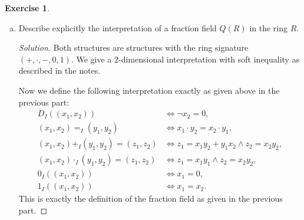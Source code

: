 \documentclass{article}
\renewcommand{\qedsymbol}{\raisebox{-0.5cm}{}}
\newenvironment{solution}{\begin{proof}[Solution]\renewcommand\qedsymbol{}}{\end{proof}}
\theoremstyle{definition}
\newtheorem{question}{Exercise}
\begin{document}
\begin{question}
\begin{enumerate}[(a)]
        \item Describe explicitly the interpretation of a fraction field
              \(Q(R)\) in the ring \(R\).

              \begin{solution}
                  Both structures are structures with the ring signature
                  \((+,\cdot,-,0,1)\). We give a \(2\)-dimensional
                  interpretation with soft inequality as described in the notes.

                  Now we define the following interpretation exactly as given
                  above in the previous part:
                  \begin{align*}
                      D_{I}((x_{1},x_{2}))                              & \Leftrightarrow \neg x_{2}=0,                                       \\
                      (x_{1},x_{2})=_{I}(y_{1},y_{2})                   & \Leftrightarrow x_{1}\cdot y_{2}=x_{2}\cdot y_{1},                  \\
                      (x_{1},x_{2})+_{I}(y_{1},y_{2})=(z_{1},z_{2})     & \Leftrightarrow z_{1}=x_{1}y_{2}+y_{1}x_{2}\wedge z_{2}=x_{2}y_{2}, \\
                      (x_{1},x_{2})\cdot_{I}(y_{1},y_{2})=(z_{1},z_{2}) & \Leftrightarrow z_{1}=x_{1}y_{1}\wedge z_{2}=x_{2}y_{2},            \\
                      0_{I}((x_{1},x_{2}))                              & \Leftrightarrow x_{1}=0,                                            \\
                      1_{I}((x_{1},x_{2}))                              & \Leftrightarrow x_{1}=x_{2}.
                  \end{align*}
                  This is exactly the definition of the fraction field as given
                  in the previous part.
              \end{solution}
    \end{enumerate}
\end{question}
\end{document}
